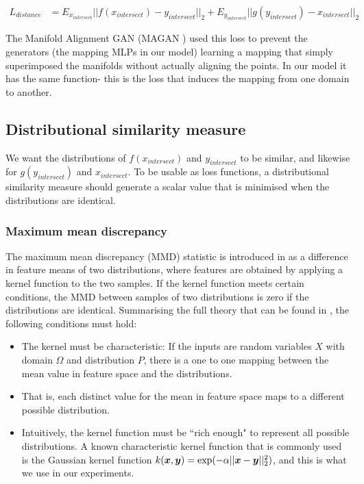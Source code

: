 \begin{equation*}
\begin{split}
L_{distance} &= E_{x_{intersect}}||f(x_{intersect}) - y_{intersect}||_2 + E_{y_{intersect}}||g(y_{intersect}) - x_{intersect}||_2
\end{split}
\end{equation*}

The Manifold Alignment GAN (MAGAN \cite{magan}) used this loss to prevent the generators (the mapping MLPs in our model) learning a mapping that simply superimposed the manifolds without actually aligning the points. In our model it has the same function- this is the loss that induces the mapping from one domain to another. 

\subsection{Distributional similarity measure}

We want the distributions of $f(x_{intersect})$ and $y_{intersect}$ to be similar, and likewise for $g(y_{intersect})$ and $x_{intersect}$. To be usable as loss functions, a distributional similarity measure should generate a scalar value that is minimised when the distributions are identical. 

\subsubsection{Maximum mean discrepancy}

The maximum mean discrepancy (MMD) statistic is introduced in \cite{MMDGretton} as a difference in feature means of two distributions, where features are obtained by applying a kernel function to the two samples. If the kernel function meets certain conditions, the MMD between samples of two distributions is zero if the distributions are identical. Summarising the full theory that can be found in \cite{MMDGretton}, the following conditions must hold:

\begin{itemize}
    \item The kernel must be characteristic: If the inputs are random variables $X$ with domain $\Omega$ and distribution $P$, there is a one to one mapping between the mean value in feature space and the distributions. \cite{KernelMeanEmbeddingReview} 
    \item That is, each distinct value for the mean in feature space maps to a different possible distribution. 
    \item Intuitively, the kernel function must be ``rich enough" to represent all possible distributions. A known characteristic kernel function that is commonly used is the Gaussian kernel function $k(\boldsymbol{x}, \boldsymbol{y}) = \exp(-\alpha ||\boldsymbol{x} - \boldsymbol{y}||_2^2)$, and this is what we use in our experiments. 
\end{itemize}

